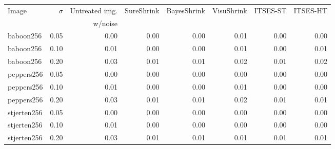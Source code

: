 \begin{tabular}{l|r|rrrrrr}
	\toprule
	Image &  $\sigma$ &  Untreated img.  &      SureShrink &   BayesShrink &    VisuShrink &  ITSES-ST &  ITSES-HT \\
	&&w/noise&&&&&\\
  baboon256 &      0.05 &   0.00 & 0.00 &   0.00 &  0.01 &      0.00 &      0.00 \\
  baboon256 &      0.10 &   0.01 & 0.00 &   0.00 &  0.01 &      0.00 &      0.01 \\
  baboon256 &      0.20 &   0.03 & 0.01 &   0.01 &  0.02 &      0.01 &      0.02 \\
 peppers256 &      0.05 &   0.00 & 0.00 &   0.00 &  0.00 &      0.00 &      0.00 \\
 peppers256 &      0.10 &   0.01 & 0.00 &   0.00 &  0.01 &      0.00 &      0.00 \\
 peppers256 &      0.20 &   0.03 & 0.01 &   0.01 &  0.02 &      0.01 &      0.01 \\
stjerten256 &      0.05 &   0.00 & 0.00 &   0.00 &  0.00 &      0.00 &      0.00 \\
stjerten256 &      0.10 &   0.01 & 0.00 &   0.00 &  0.00 &      0.00 &      0.00 \\
stjerten256 &      0.20 &   0.03 & 0.01 &   0.01 &  0.01 &      0.01 &      0.01 \\
\bottomrule
\end{tabular}
